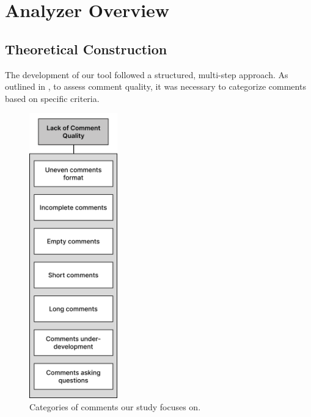 
\chapter{Analyzer Overview} %

\label{Chapter3}

\section{Theoretical Construction}
The development of our tool followed a structured, multi-step approach. As outlined in , to assess comment quality, it was necessary to categorize comments based on specific criteria.

\begin{figure}[ht]
	\centering\includegraphics[height=350pt]{figs/goal-schema.PNG}
	\captionsetup{justification=centering}
	\caption{Categories of comments our study focuses on.}
	\label{fig:goal-schema}
\end{figure}


